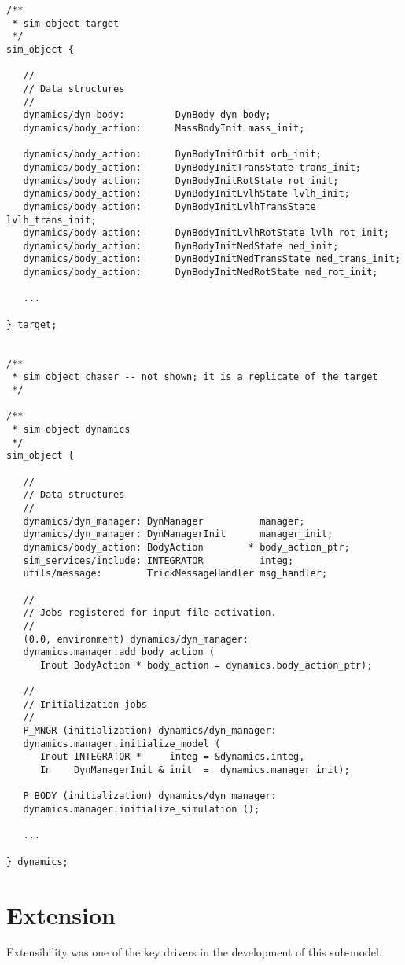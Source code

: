 \begin{verbatim}
/**
 * sim object target
 */
sim_object {

   //
   // Data structures
   //
   dynamics/dyn_body:         DynBody dyn_body;
   dynamics/body_action:      MassBodyInit mass_init;

   dynamics/body_action:      DynBodyInitOrbit orb_init;
   dynamics/body_action:      DynBodyInitTransState trans_init;
   dynamics/body_action:      DynBodyInitRotState rot_init;
   dynamics/body_action:      DynBodyInitLvlhState lvlh_init;
   dynamics/body_action:      DynBodyInitLvlhTransState lvlh_trans_init;
   dynamics/body_action:      DynBodyInitLvlhRotState lvlh_rot_init;
   dynamics/body_action:      DynBodyInitNedState ned_init;
   dynamics/body_action:      DynBodyInitNedTransState ned_trans_init;
   dynamics/body_action:      DynBodyInitNedRotState ned_rot_init;

   ...

} target;


/**
 * sim object chaser -- not shown; it is a replicate of the target
 */

/**
 * sim object dynamics
 */
sim_object {

   //
   // Data structures
   //
   dynamics/dyn_manager: DynManager          manager;
   dynamics/dyn_manager: DynManagerInit      manager_init;
   dynamics/body_action: BodyAction        * body_action_ptr;
   sim_services/include: INTEGRATOR          integ;
   utils/message:        TrickMessageHandler msg_handler;

   //
   // Jobs registered for input file activation.
   //
   (0.0, environment) dynamics/dyn_manager:
   dynamics.manager.add_body_action (
      Inout BodyAction * body_action = dynamics.body_action_ptr);

   //
   // Initialization jobs
   //
   P_MNGR (initialization) dynamics/dyn_manager:
   dynamics.manager.initialize_model (
      Inout INTEGRATOR *     integ = &dynamics.integ,
      In    DynManagerInit & init  =  dynamics.manager_init);

   P_BODY (initialization) dynamics/dyn_manager:
   dynamics.manager.initialize_simulation ();

   ...

} dynamics;
\end{verbatim}


\section{Extension}
Extensibility was one of the key drivers in the development of this sub-model.

